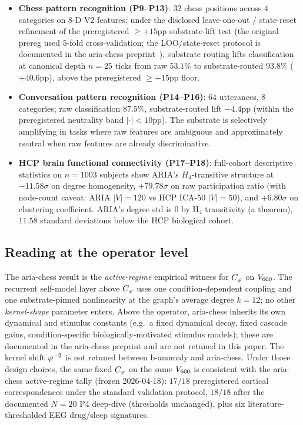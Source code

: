 \begin{itemize}\itemsep=2pt
\item \textbf{Chess pattern recognition (P9--P13)}: $32$ chess
  positions across $4$ categories on $8$-D V2 features; under the
  disclosed leave-one-out / state-reset refinement of the
  preregistered $\geq +15$pp substrate-lift test (the original
  prereg used $5$-fold cross-validation; the LOO/state-reset
  protocol is documented in the aria-chess
  preprint~\citep{SmartAriaChess2026}), substrate routing lifts
  classification at canonical depth $n=25$ ticks from raw
  $53.1\%$ to substrate-routed $93.8\%$ ($+40.6$pp), above the
  preregistered $\geq +15$pp floor.
\item \textbf{Conversation pattern recognition (P14--P16)}:
  $64$ utterances, $8$ categories; raw classification $87.5\%$,
  substrate-routed lift $-4.4$pp (within the preregistered
  neutrality band $|\cdot| < 10$pp). The substrate is selectively
  amplifying in tasks where raw features are ambiguous and
  approximately neutral when raw features are already
  discriminative.
\item \textbf{HCP brain functional connectivity (P17--P18)}:
  full-cohort descriptive statistics on $n=1003$ subjects show
  ARIA's $H_4$-transitive structure at $-11.58\sigma$ on degree
  homogeneity, $+79.78\sigma$ on raw participation ratio (with
  node-count caveat: ARIA $|V|=120$ vs HCP ICA-50 $|V|=50$), and
  $+6.80\sigma$ on clustering coefficient. ARIA's degree std is
  $0$ by H$_4$ transitivity (a theorem), $11.58$ standard
  deviations below the HCP biological cohort.
\end{itemize}

\subsection{Reading at the operator level}

The aria-chess result is the \emph{active-regime} empirical
witness for $C_{\varphi}$ on $V_{600}$. The recurrent self-model
layer above $C_{\varphi}$ uses one condition-dependent coupling and one
substrate-pinned nonlinearity at the graph's average degree
$k=12$; no other \emph{kernel-shape} parameter enters. Above the
operator, aria-chess inherits its own dynamical and stimulus
constants (e.g.\ a fixed dynamical decay, fixed cascade gains,
condition-specific biologically-motivated stimulus models); these
are documented in the aria-chess preprint and are not retuned in
this paper. The kernel shift $\varphi^{-2}$ is not retuned between
b-anomaly and aria-chess. Under those design choices, the same
fixed $C_{\varphi}$ on the same $V_{600}$ is consistent with the
aria-chess active-regime tally (frozen 2026-04-18): $17/18$
preregistered cortical correspondences under the standard
validation protocol, $18/18$ after the documented $N\!=\!20$ P4
deep-dive (thresholds unchanged), plus six literature-thresholded
EEG drug/sleep signatures.

